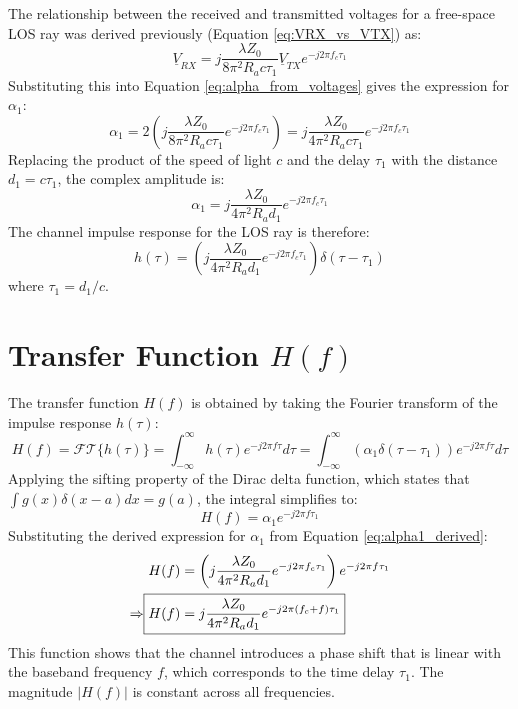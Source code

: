 The relationship between the received and transmitted voltages for a free-space LOS ray was derived previously (Equation \ref{eq:VRX_vs_VTX}) as:
\begin{equation}
	\underline{V}_{RX} = j \frac{\lambda Z_0}{8\pi^2 R_a c\tau_1} \underline{V}_{TX} e^{-j2\pi f_c \tau_1}
\end{equation}
Substituting this into Equation \eqref{eq:alpha_from_voltages} gives the expression for $\alpha_1$:
\begin{equation}
	\alpha_1 = 2 \left( j \frac{\lambda Z_0}{8\pi^2 R_a c\tau_1} e^{-j2\pi f_c \tau_1} \right) = j \frac{\lambda Z_0}{4\pi^2 R_a c\tau_1} e^{-j2\pi f_c \tau_1}
\end{equation}
Replacing the product of the speed of light $c$ and the delay $\tau_1$ with the distance $d_1 = c\tau_1$, the complex amplitude is:
\begin{equation}
	\alpha_1 = j \frac{\lambda Z_0}{4\pi^2 R_a d_1} e^{-j2\pi f_c \tau_1}
	\label{eq:alpha1_derived}
\end{equation}
The channel impulse response for the LOS ray is therefore:
\begin{equation}
	\boxed{h(\tau) = \left( j \frac{\lambda Z_0}{4\pi^2 R_a d_1} e^{-j2\pi f_c \tau_1} \right) \delta(\tau - \tau_1)}
	\label{eq:los_impulse_response_derived_detailed}
\end{equation}
where $\tau_1 = d_1/c$.

\section{Transfer Function $H(f)$}
The transfer function $H(f)$ is obtained by taking the Fourier transform of the impulse response $h(\tau)$:
\begin{equation}
	H(f) = \mathcal{FT}\{ h(\tau)\} =  \int_{-\infty}^{\infty} h(\tau) e^{-j2\pi f \tau} d\tau = \int_{-\infty}^{\infty} \left( \alpha_1 \delta(\tau - \tau_1) \right) e^{-j2\pi f \tau} d\tau
\end{equation}
Applying the sifting property of the Dirac delta function, which states that $\int g(x)\delta(x-a)dx = g(a)$, the integral simplifies to:
\begin{equation}
	H(f) = \alpha_1 e^{-j2\pi f \tau_1}
\end{equation}
Substituting the derived expression for $\alpha_1$ from Equation \ref{eq:alpha1_derived}:
\begin{align}
	H(f) &= \left( j \frac{\lambda Z_0}{4\pi^2 R_a d_1} e^{-j2\pi f_c \tau_1} \right) e^{-j2\pi f \tau_1} \\
	\Rightarrow \Aboxed{H(f) &= j \frac{\lambda Z_0}{4\pi^2 R_a d_1} e^{-j2\pi (f_c + f) \tau_1}}
	\label{eq:los_transfer_function_detailed}
\end{align}
This function shows that the channel introduces a phase shift that is linear with the baseband frequency $f$, which corresponds to the time delay $\tau_1$. The magnitude $|H(f)|$ is constant across all frequencies.

